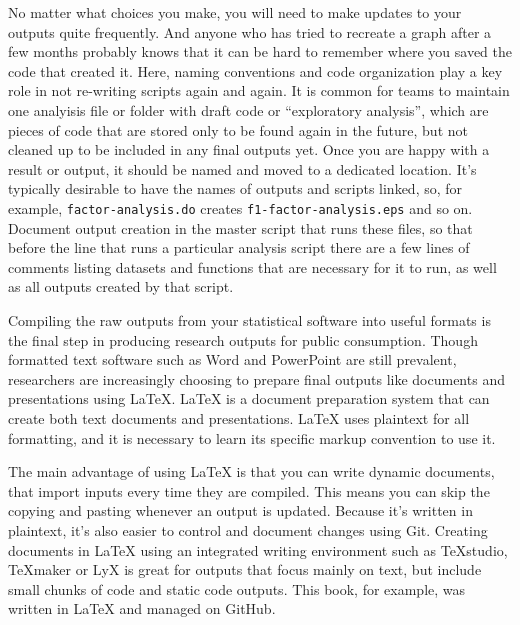 No matter what choices you make,
you will need to make updates to your outputs quite frequently.
And anyone who has tried to recreate a graph after a few months probably knows
that it can be hard to remember where you saved the code that created it.
Here, naming conventions and code organization play a key role
in not re-writing scripts again and again.
It is common for teams to maintain one analyisis file or folder with draft code or ``exploratory analysis'',
which are pieces of code that are stored only to be found again in the future,
but not cleaned up to be included in any final outputs yet.
Once you are happy with a result or output,
it should be named and moved to a dedicated location.
It's typically desirable to have the names of outputs and scripts linked,
so, for example, \texttt{factor-analysis.do} creates \texttt{f1-factor-analysis.eps} and so on.
Document output creation in the master script that runs these files,
so that before the line that runs a particular analysis script
there are a few lines of comments listing
datasets and functions that are necessary for it to run,
as well as all outputs created by that script.

Compiling the raw outputs from your statistical software into useful formats
is the final step in producing research outputs for public consumption.
Though formatted text software such as Word and PowerPoint are still prevalent,
researchers are increasingly choosing to prepare final outputs
like documents and presentations using {\LaTeX}\index{{\LaTeX}}.
{\LaTeX} is a document preparation system that can create both text documents and presentations.
{\LaTeX} uses plaintext for all formatting,
and it is necessary to learn its specific markup convention to use it.

The main advantage of using {\LaTeX} is that you can write dynamic documents,
that import inputs every time they are compiled.
This means you can skip the copying and pasting whenever an output is updated.
Because it's written in plaintext, it's also easier to control and document changes using Git.
Creating documents in {\LaTeX} using an integrated writing environment such as TeXstudio, TeXmaker or LyX
is great for outputs that focus mainly on text,
but include small chunks of code and static code outputs.
This book, for example, was written in {\LaTeX} and managed on GitHub.

